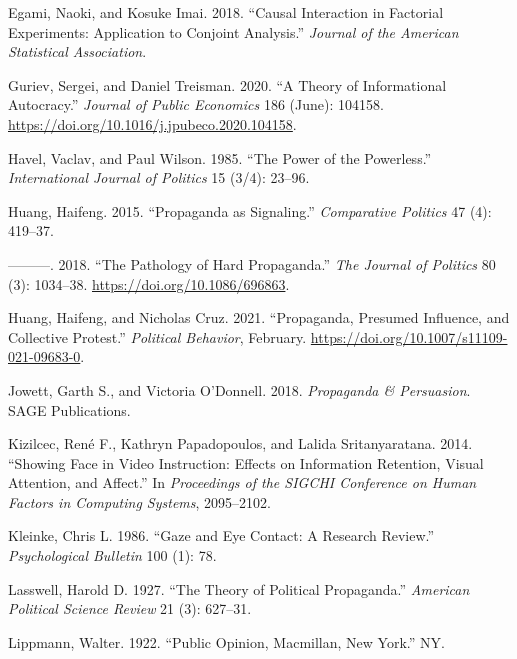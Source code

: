 \documentclass[
  12pt,
]{ctexart}
\newlength{\cslhangindent}
\newlength{\cslentryspacingunit} %
\newenvironment{CSLReferences}[2] %
 {%
  \setlength{\parindent}{0pt}
  \ifodd #1
  \let\oldpar\par
  \def\par{\hangindent=\cslhangindent\oldpar}
  \fi
  \setlength{\parskip}{#2\cslentryspacingunit}
 }%
 {}
\begin{document}
\begin{CSLReferences}{1}{0}
\leavevmode{}%
Egami, Naoki, and Kosuke Imai. 2018. {``Causal Interaction in Factorial Experiments: {Application} to Conjoint Analysis.''} \emph{Journal of the American Statistical Association}.

\leavevmode{}%
Guriev, Sergei, and Daniel Treisman. 2020. {``A Theory of Informational Autocracy.''} \emph{Journal of Public Economics} 186 (June): 104158. \url{https://doi.org/10.1016/j.jpubeco.2020.104158}.

\leavevmode{}%
Havel, Vaclav, and Paul Wilson. 1985. {``The Power of the Powerless.''} \emph{International Journal of Politics} 15 (3/4): 23--96.

\leavevmode{}%
Huang, Haifeng. 2015. {``Propaganda as {Signaling}.''} \emph{Comparative Politics} 47 (4): 419--37.

\leavevmode{}%
---------. 2018. {``The {Pathology} of {Hard Propaganda}.''} \emph{The Journal of Politics} 80 (3): 1034--38. \url{https://doi.org/10.1086/696863}.

\leavevmode{}%
Huang, Haifeng, and Nicholas Cruz. 2021. {``Propaganda, {Presumed Influence}, and {Collective Protest}.''} \emph{Political Behavior}, February. \url{https://doi.org/10.1007/s11109-021-09683-0}.

\leavevmode{}%
Jowett, Garth S., and Victoria O'Donnell. 2018. \emph{Propaganda \& {Persuasion}}. {SAGE Publications}.

\leavevmode{}%
Kizilcec, René F., Kathryn Papadopoulos, and Lalida Sritanyaratana. 2014. {``Showing Face in Video Instruction: Effects on Information Retention, Visual Attention, and Affect.''} In \emph{Proceedings of the {SIGCHI} Conference on Human Factors in Computing Systems}, 2095--2102.

\leavevmode{}%
Kleinke, Chris L. 1986. {``Gaze and Eye Contact: A Research Review.''} \emph{Psychological Bulletin} 100 (1): 78.

\leavevmode{}%
Lasswell, Harold D. 1927. {``The Theory of Political Propaganda.''} \emph{American Political Science Review} 21 (3): 627--31.

\leavevmode{}%
Lippmann, Walter. 1922. {``Public Opinion, {Macmillan}, {New York}.''} {NY}.


\end{CSLReferences}
\end{document}
